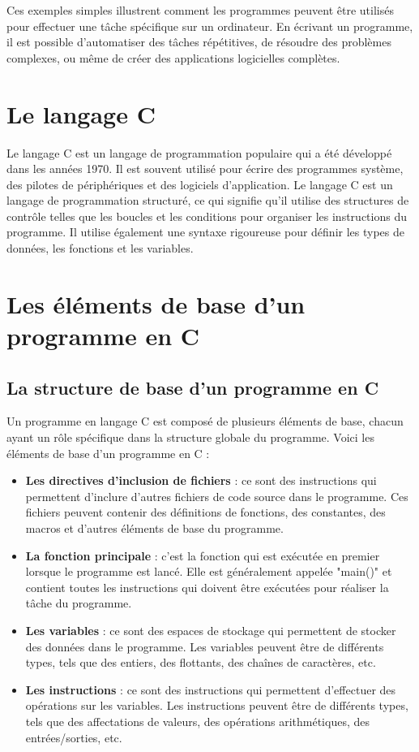 \documentclass{uofa-eng-assignment}
\begin{document}
\noindent
Ces exemples simples illustrent comment les programmes peuvent être utilisés pour effectuer une tâche spécifique sur un ordinateur. En écrivant un programme, il est possible d'automatiser des tâches répétitives, de résoudre des problèmes complexes, ou même de créer des applications logicielles complètes.

\section{Le langage C}
Le langage C est un langage de programmation populaire qui a été développé dans les années 1970. Il est souvent utilisé pour écrire des programmes système, des pilotes de périphériques et des logiciels d'application.
\newline \newline
Le langage C est un langage de programmation structuré, ce qui signifie qu'il utilise des structures de contrôle telles que les boucles et les conditions pour organiser les instructions du programme. Il utilise également une syntaxe rigoureuse pour définir les types de données, les fonctions et les variables.

\section{Les éléments de base d'un programme en C}
\subsection{La structure de base d'un programme en C}
Un programme en langage C est composé de plusieurs éléments de base, chacun ayant un rôle spécifique dans la structure globale du programme. Voici les éléments de base d'un programme en C :

\begin{itemize}
    \item \textbf{Les directives d'inclusion de fichiers} : ce sont des instructions qui permettent d'inclure d'autres fichiers de code source dans le programme. Ces fichiers peuvent contenir des définitions de fonctions, des constantes, des macros et d'autres éléments de base du programme.
    \item \textbf{La fonction principale} : c'est la fonction qui est exécutée en premier lorsque le programme est lancé. Elle est généralement appelée "main()" et contient toutes les instructions qui doivent être exécutées pour réaliser la tâche du programme.
    \item \textbf{Les variables} : ce sont des espaces de stockage qui permettent de stocker des données dans le programme. Les variables peuvent être de différents types, tels que des entiers, des flottants, des chaînes de caractères, etc.
    \item \textbf{Les instructions} : ce sont des instructions qui permettent d'effectuer des opérations sur les variables. Les instructions peuvent être de différents types, tels que des affectations de valeurs, des opérations arithmétiques, des entrées/sorties, etc.
\end{itemize}
\end{document}
